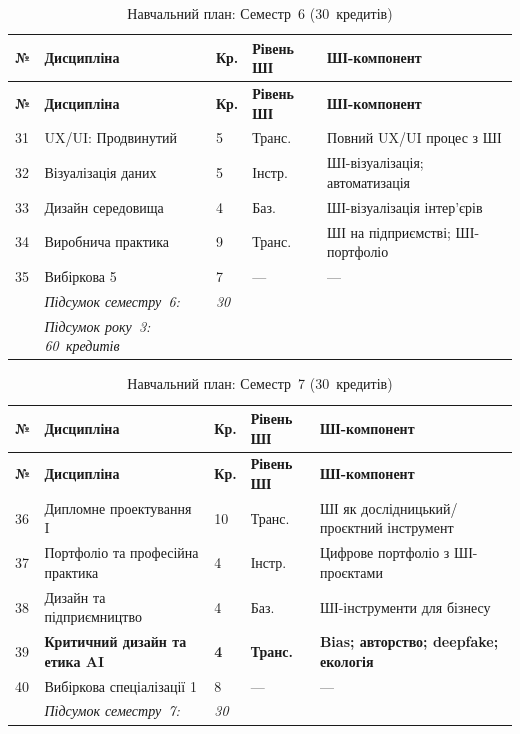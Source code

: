 \begin{longtable}{@{}p{}p{}p{}p{}p{}@{}}
\caption{Навчальний план: Семестр~6 (30~кредитів)}\label{tab:app-sem6} \\
\hline
\textbf{№} & \textbf{Дисципліна} & \textbf{Кр.} & \textbf{Рівень ШІ} & \textbf{ШІ-компонент} \\
\hline
\endfirsthead
\hline
\textbf{№} & \textbf{Дисципліна} & \textbf{Кр.} & \textbf{Рівень ШІ} & \textbf{ШІ-компонент} \\
\hline
\endhead
31 & UX/UI: Продвинутий & 5 & Транс. & Повний UX/UI процес з ШІ \\
32 & Візуалізація даних & 5 & Інстр. & ШІ-візуалізація; автоматизація \\
33 & Дизайн середовища & 4 & Баз. & ШІ-візуалізація інтер'єрів \\
34 & Виробнича практика & 9 & Транс. & ШІ на підприємстві; ШІ-портфоліо \\
35 & Вибіркова 5 & 7 & --- & --- \\
\addlinespace
& \textit{Підсумок семестру~6:} & \textit{30} & & \\
& \textit{Підсумок року~3: 60~кредитів} & & & \\
\hline
\end{longtable}

\begin{longtable}{@{}p{}p{}p{}p{}p{}@{}}
\caption{Навчальний план: Семестр~7 (30~кредитів)}\label{tab:app-sem7} \\
\hline
\textbf{№} & \textbf{Дисципліна} & \textbf{Кр.} & \textbf{Рівень ШІ} & \textbf{ШІ-компонент} \\
\hline
\endfirsthead
\hline
\textbf{№} & \textbf{Дисципліна} & \textbf{Кр.} & \textbf{Рівень ШІ} & \textbf{ШІ-компонент} \\
\hline
\endhead
36 & Дипломне проектування I & 10 & Транс. & ШІ як дослідницький/проєктний інструмент \\
37 & Портфоліо та професійна практика & 4 & Інстр. & Цифрове портфоліо з ШІ-проєктами \\
38 & Дизайн та підприємництво & 4 & Баз. & ШІ-інструменти для бізнесу \\
39 & \textbf{Критичний дизайн та етика AI} & \textbf{4} & \textbf{Транс.} & \textbf{Bias; авторство; deepfake; екологія} \\
40 & Вибіркова спеціалізації 1 & 8 & --- & --- \\
\addlinespace
& \textit{Підсумок семестру~7:} & \textit{30} & & \\
\hline
\end{longtable}


